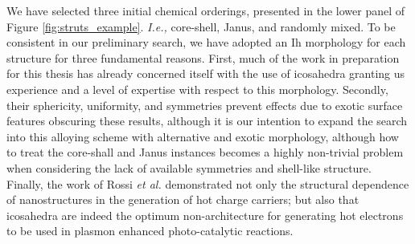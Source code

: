 We have selected three initial chemical orderings, presented in the lower panel of Figure \ref{fig:struts_example}. \textit{I.e.,} core-shell, Janus, and randomly mixed. To be consistent in our preliminary search, we have adopted an Ih morphology for each structure for three fundamental reasons. First, much of the work in preparation for this thesis has already concerned itself with the use of icosahedra granting us experience and a level of expertise with respect to this morphology. Secondly, their sphericity, uniformity, and symmetries prevent effects due to exotic surface features obscuring these results, although it is our intention to expand the search into this alloying scheme with alternative and exotic morphology, although how to treat the core-shall and Janus instances becomes a highly non-trivial problem when considering the lack of available symmetries and shell-like structure. Finally, the work of Rossi \textit{et al.}  \cite{TRossi2020} demonstrated not only the structural dependence of nanostructures in the generation of hot charge carriers; but also that icosahedra are indeed the optimum non-architecture for generating hot electrons to be used in plasmon enhanced photo-catalytic reactions.

